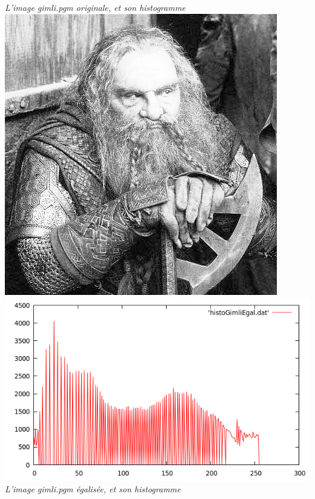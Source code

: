 \documentclass[a4paper,11pt]{article}
\begin{document}
\begin{center}
\textit{L'image gimli.pgm originale, et son histogramme}\\
\includegraphics[scale=0.25]{gimliegal.png}
\includegraphics[scale=0.25]{histoGimliEgal.png}\\
\textit{L'image gimli.pgm égalisée, et son histogramme}
\end{center}
\end{document}
